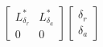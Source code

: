 \begin{equation*}
\begin{split}
\begin{bmatrix}
                                                            L_{\delta_r}^* & L_{\delta_a}^* \\
                                                            0              & 0
                                                        \end{bmatrix} \begin{bmatrix}
                                                                          \delta_r \\
                                                                          \delta_a
                                                                      \end{bmatrix}
    \end{split}
\end{equation*}
